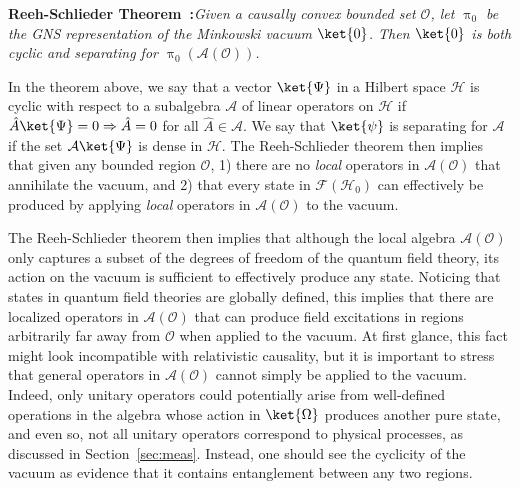 \documentclass[letterpaper,12pt,titlepage,oneside,final]{book}
\begin{document}
\noindent \textbf{Reeh-Schlieder Theorem~\cite{ReehSchli,HaagOG}:}\textit{Given a causally convex bounded set $\mathcal{O}$, let $\uppi_0$ be the GNS representation of the Minkowski vacuum $\ket{0}$. Then $\ket{0}$ is both cyclic and separating for $\uppi_0(\mathcal{A}(\mathcal{O}))$.}

In the theorem above, we say that a vector $\ket{\Psi}$ in a Hilbert space $\mathscr{H}$ is cyclic with respect to a subalgebra $\mathcal{A}$ of linear operators on $\mathscr{H}$ if $\hat{A} \ket{\Psi} = 0 \Rightarrow \hat{A} = 0$ for all $\hat{A} \in \mathcal{A}$. We say that $\ket{\psi}$ is separating for $\mathcal{A}$ if the set $\mathcal{A}\ket{\Psi}$ is dense in $\mathscr{H}$. The Reeh-Schlieder theorem then implies that given any bounded region $\mathcal{O}$, 1) there are no \textit{local} operators in $\mathcal{A}(\mathcal{O})$ that annihilate the vacuum, and 2) that every state in $\mathcal{F}(\mathscr{H}_0)$ can effectively be produced by applying \textit{local} operators in $\mathcal{A}(\mathcal{O})$ to the vacuum.

The Reeh-Schlieder theorem then implies that although the local algebra $\mathcal{A}(\mathcal{O})$ only captures a subset of the degrees of freedom of the quantum field theory, its action on the vacuum is sufficient to effectively produce any state. Noticing that states in quantum field theories are globally defined, this implies that there are localized operators in $\mathcal{A}(\mathcal{O})$ that can produce field excitations in regions arbitrarily far away from $\mathcal{O}$ when applied to the vacuum. At first glance, this fact might look incompatible with relativistic causality, but it is important to stress that general operators in $\mathcal{A}(\mathcal{O})$ cannot simply be applied to the vacuum. Indeed, only unitary operators could potentially arise from well-defined operations in the algebra whose action in $\ket{\Omega}$ produces another pure state, and even so, not all unitary operators correspond to physical processes, as discussed in Section~\ref{sec:meas}. Instead, one should see the cyclicity of the vacuum as evidence that it contains entanglement between any two regions.
\end{document}
